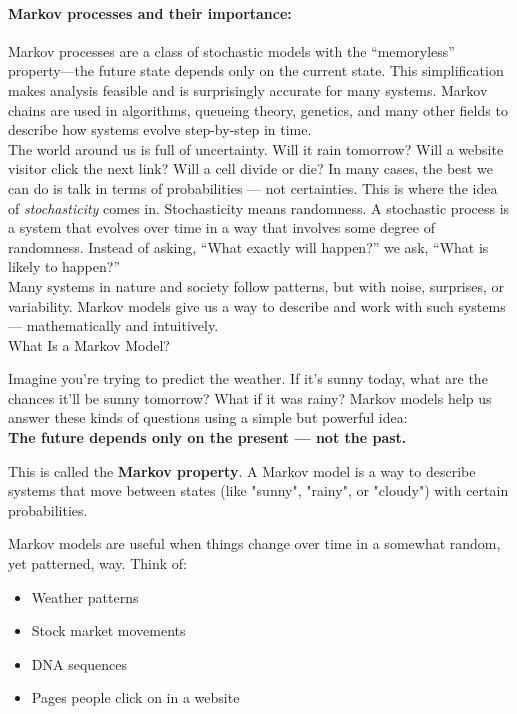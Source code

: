 \documentclass{book}
\begin{document}
\paragraph{Markov processes and their importance:}
Markov processes are a class of stochastic models with the “memoryless” property—the future state depends only on the current state. This simplification makes analysis feasible and is surprisingly accurate for many systems. Markov chains are used in algorithms, queueing theory, genetics, and many other fields to describe how systems evolve step-by-step in time.\\

The world around us is full of uncertainty. Will it rain tomorrow? Will a website visitor click the next link? Will a cell divide or die? In many cases, the best we can do is talk in terms of probabilities — not certainties. This is where the idea of \textit{stochasticity} comes in. Stochasticity means randomness. A stochastic process is a system that evolves over time in a way that involves some degree of randomness. Instead of asking, “What exactly will happen?” we ask, “What is likely to happen?”\\

Many systems in nature and society follow patterns, but with noise, surprises, or variability. Markov models give us a way to describe and work with such systems — mathematically and intuitively.\\

What Is a Markov Model?

Imagine you're trying to predict the weather. If it’s sunny today, what are the chances it’ll be sunny tomorrow? What if it was rainy? Markov models help us answer these kinds of questions using a simple but powerful idea:\\

\textbf{The future depends only on the present — not the past.}

This is called the \textbf{Markov property}. A Markov model is a way to describe systems that move between states (like "sunny", "rainy", or "cloudy") with certain probabilities.

Markov models are useful when things change over time in a somewhat random, yet patterned, way. Think of:

\begin{itemize}
  \item Weather patterns
  \item Stock market movements
  \item DNA sequences
  \item Pages people click on in a website
\end{itemize}
\end{document}

